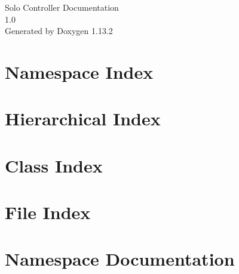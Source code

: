 \documentclass[twoside]{book}
\newcommand{\+}{\discretionary{\mbox{\scriptsize$\hookleftarrow$}}{}{}}
\newcommand{\clearemptydoublepage}{%
    \newpage{\pagestyle{empty}\cleardoublepage}%
  }
\begin{document}
  \raggedbottom
    \hypersetup{pageanchor=false,
                bookmarksnumbered=true,
                pdfencoding=unicode
               }
  \begin{titlepage}
  \vspace*{7cm}
  \begin{center}%
  {\Large Solo Controller Documentation}\\
  [1ex]\large 1.\+0 \\
  \vspace*{1cm}
  {\large Generated by Doxygen 1.13.2}\\
  \end{center}
  \end{titlepage}
  \clearemptydoublepage
  \tableofcontents
  \clearemptydoublepage
  \hypersetup{pageanchor=true}

\chapter{Namespace Index}

\chapter{Hierarchical Index}

\chapter{Class Index}

\chapter{File Index}

\chapter{Namespace Documentation}



















\end{document}

